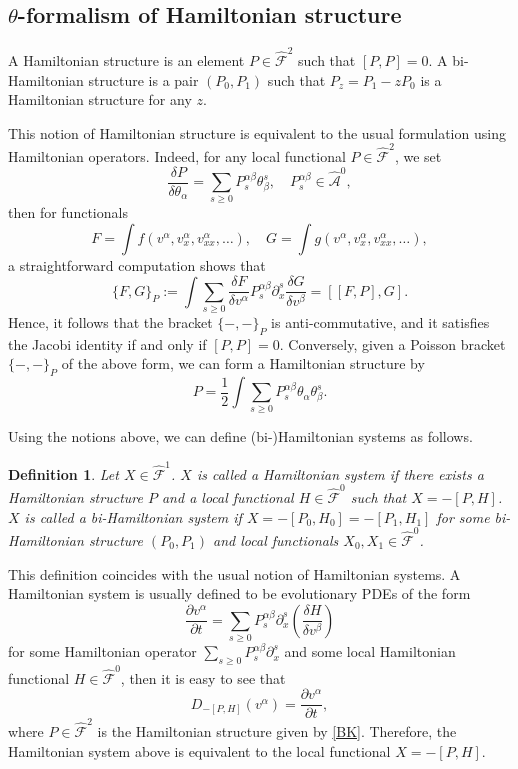 \documentclass[11pt,a4paper]{amsart}
\numberwithin{equation}{section}
\newtheorem{definition}[theorem]{Definition}
\newcommand{\diff}[2]{\frac{\partial #1}{\partial #2}}
\newcommand{\qa}{\alpha}
\newcommand{\qb}{\beta}
\newcommand{\qth}{\theta}
\newcommand{\qp}{\partial}
\newcommand{\vard}[2]{\frac{\delta #1}{\delta #2}}
\newcommand{\hm}[1]{\hat{\mathcal #1}}
\newcommand{\kk}[1]{\left(#1\right)}
\newcommand{\jja}{\mathcal{\hat A}}
\newcommand{\jjf}{\mathcal{\hat F}}
\numberwithin{equation}{section}
\begin{document}
\subsection{$\qth$-formalism of Hamiltonian structure}
A Hamiltonian structure is an element $P\in\jjf^2$ such that $[P,P] = 0$. A bi-Hamiltonian structure is a pair $(P_0,P_1)$ such that $P_z = P_1-z P_0$ is a Hamiltonian structure for any $z$.

This notion of Hamiltonian structure is equivalent to the usual formulation using Hamiltonian operators. Indeed, for any local functional $P\in\jjf^2$, we set 
\[
\vard{P}{\qth_\qa} = \sum_{s\geq 0} P^{\qa\qb}_s\qth_\qb^s,\quad P^{\qa\qb}_s\in \jja^0,
\]
then for functionals 
\[
F = \int f\left(v^\qa,v^{\qa}_x,v^\qa_{xx},\dots\right),\quad G =  \int g\left(v^\qa,v^{\qa}_x,v^\qa_{xx},\dots\right),
\]
a straightforward computation shows that 
\[
\{F,G\}_P := \int\sum_{s\geq 0}\vard{F}{v^\qa}P^{\qa\qb}_s\qp_x^s\vard{G}{v^\qb} = [[F,P],G].
\]
Hence, it follows that the bracket $\{-,-\}_P$ is anti-commutative, and it satisfies the Jacobi identity if and only if $[P,P] = 0$. Conversely, given a Poisson bracket $\{-,-\}_P$ of the above form, we can form a Hamiltonian structure by 
\begin{equation}
  \label{BK}
P = \frac 12\int  \sum_{s\geq 0} P^{\qa\qb}_s\qth_\qa\qth_\qb^s.
\end{equation}

Using the notions above, we can define (bi-)Hamiltonian systems as follows.
\begin{definition}
  \label{BJ}
  Let $X\in \hm F^1$. $X$ is called a Hamiltonian system if there exists a Hamiltonian structure $P$ and a local functional $H\in\hm F^0$ such that $X = -[P,H]$. $X$ is called a bi-Hamiltonian system if $X = -[P_0,H_0] = -[P_1,H_1]$ for some bi-Hamiltonian structure $(P_0,P_1)$ and local functionals $X_0,X_1\in\hm F^0$.
\end{definition}
This definition coincides with the usual notion of Hamiltonian systems. A Hamiltonian system is usually defined to be evolutionary PDEs of the form 
\[
\diff{v^\qa}{t} = \sum_{s\geq 0}P^{\qa\qb}_s\qp_x^s\kk{\vard{H}{v^\qb}}
\]
for some Hamiltonian operator $\sum_{s\geq 0}P^{\qa\qb}_s\qp_x^s$ and some local Hamiltonian functional $H\in\hm F^0$, then it is easy to see that 
\[
D_{-[P,H]}(v^\qa) = \diff{v^\qa}{t},
\]
where $P\in\hm F^2$ is the Hamiltonian structure given by \eqref{BK}. Therefore, the Hamiltonian system above is equivalent to the local functional $X = -[P,H]$.
\end{document}
